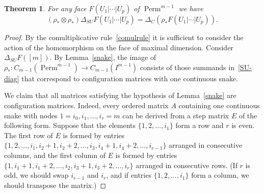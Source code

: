 \documentclass[a4paper,12pt]{amsart}
\newtheorem{theorem}[formula]{Theorem}
\theoremstyle{definition}
\theoremstyle{remark}
\numberwithin{equation}{section}
\DeclareMathOperator{\Perm}{Perm}
\begin{document}
\begin{theorem}
For any face $F(U_1 | \cdots | U_p)$ of $\Perm^{m-1}$ we have
$$(\rho_* \otimes \rho_*) \Delta_{SU} F(U_1 | \cdots | U_p) = \Delta_{C}(\rho_* F(U_1 | \cdots | U_p)).$$
\end{theorem}
\begin{proof}
By the comultiplicative rule~\eqref{comulrule} it is sufficient to consider the action of the homomorphism on the face of maximal dimension.
Consider $\Delta_{SU}F([m])$. By Lemma~\ref{snake}, the image of $\rho_* \colon C_{m-1}(\Perm^{m-1}) \to C_{m-1}(I^{m-1})$ consists of those
summands in~\eqref{SU-diag} that correspond to configuration matrices with one continuous snake.

We claim that all matrices satisfying the hypothesis of Lemma~\ref{snake} are configuration matrices.
Indeed, every ordered matrix $A$ containing one continuous snake with nodes $1=i_0, i_1, \ldots, i_r = m$ can be derived from a step matrix $E$ of the following form. 
Suppose that the elements $\{1, 2, \ldots, i_1 \}$ form a row and $r$ is even.
The first row of $E$ is formed by entries $\{1, 2, \ldots, i_1, i_2+1, i_2 + 2, \ldots, i_3, i_4+1, i_4 + 2, \ldots, i_{r - 1}\}$ arranged in consecutive columns, and the first column of $E$ is formed by entries
$\{1, i_1 + 1, i_1 + 2, \ldots, i_2, i_3 + 1, i_3 + 2, \ldots, i_r \}$ arranged in consecutive rows. (If $r$ is odd, we should swap $i_{r-1}$ and $i_r$, and if entries $\{1, 2, \ldots, i_1 \}$ form a column, we should transpose the matrix.)


\end{proof}
\end{document}

